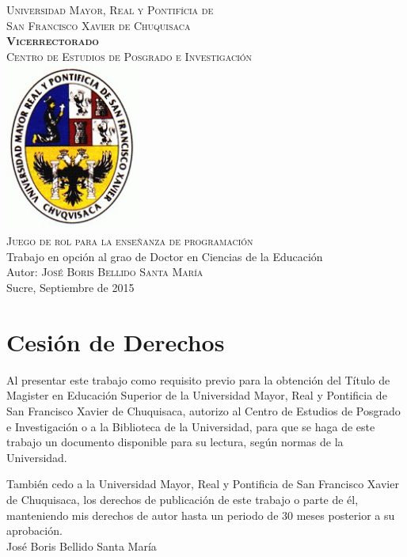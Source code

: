 \documentclass[12pt,letterpaper,titlepage,oneside]{book}
\begin{document}
\begin{titlepage}
\begin{center}
{\LARGE {\textsc{Universidad Mayor, Real y Pontifícia de \\ San Francisco Xavier de Chuquisaca}}} \\ [1.3cm]
{\Large \textsc \textbf{\textsc{Vicerrectorado}}} \\ [1.3cm]
{\Large \textsc{Centro de Estudios de Posgrado e Investigación}} \\ [1.3cm]
\includegraphics[width=4.4cm]{escudo.jpg} \\ [1.3cm]
{\Large {\textsc{Juego de rol para la enseñanza de programación}}} \\[1.3cm]
 {Trabajo en opción al grao de Doctor en Ciencias de la Educación} \\[1.3cm]
{Autor: \textsc{José Boris Bellido Santa María}}\\[1.3cm]
Sucre, Septiembre de 2015
\end{center}
\end{titlepage}

\chapter*{Cesión de Derechos}
Al presentar este trabajo como requisito previo para la obtención del Título de Magister en
Educación Superior de la Universidad Mayor, Real y Pontificia de San Francisco Xavier de Chuquisaca, autorizo al Centro de Estudios de Posgrado e Investigación o a la Biblioteca de la Universidad, para que se haga de este trabajo un documento disponible para su lectura, según normas de la Universidad.

También cedo a la Universidad Mayor, Real y Pontificia de San Francisco Xavier de Chuquisaca, los derechos de publicación de este trabajo o parte de él, manteniendo mis derechos de autor hasta un periodo de 30 meses posterior a su aprobación.
\\[3cm]

\centering José Boris Bellido Santa María
\end{document}
